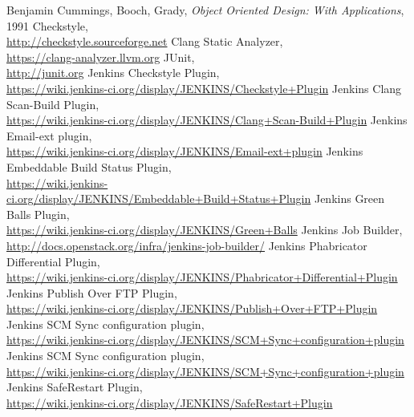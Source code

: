 \documentclass[a4paper,twocolumn,10pt]{article}
\begin{document}
\begin{thebibliography}{999}
 Benjamin Cummings, Booch, Grady, \textit{Object Oriented Design: With Applications},\\
1991
 Checkstyle,\\
\url{http://checkstyle.sourceforge.net}
 Clang Static Analyzer,\\
\url{https://clang-analyzer.llvm.org}
 JUnit,\\
\url{http://junit.org}
 Jenkins Checkstyle Plugin,\\
\url{https://wiki.jenkins-ci.org/display/JENKINS/Checkstyle+Plugin}
 Jenkins Clang Scan-Build Plugin,\\
\url{https://wiki.jenkins-ci.org/display/JENKINS/Clang+Scan-Build+Plugin}
 Jenkins Email-ext plugin,\\
\url{https://wiki.jenkins-ci.org/display/JENKINS/Email-ext+plugin}
 Jenkins Embeddable Build Status Plugin,\\
\url{https://wiki.jenkins-ci.org/display/JENKINS/Embeddable+Build+Status+Plugin}
 Jenkins Green Balls Plugin,\\
\url{https://wiki.jenkins-ci.org/display/JENKINS/Green+Balls}
 Jenkins Job Builder,\\
\url{http://docs.openstack.org/infra/jenkins-job-builder/}
 Jenkins Phabricator Differential Plugin,\\
\url{https://wiki.jenkins-ci.org/display/JENKINS/Phabricator+Differential+Plugin}
 Jenkins Publish Over FTP Plugin,\\
\url{https://wiki.jenkins-ci.org/display/JENKINS/Publish+Over+FTP+Plugin}
 Jenkins SCM Sync configuration plugin,\\
\url{https://wiki.jenkins-ci.org/display/JENKINS/SCM+Sync+configuration+plugin}
 Jenkins SCM Sync configuration plugin,\\
\url{https://wiki.jenkins-ci.org/display/JENKINS/SCM+Sync+configuration+plugin}
 Jenkins SafeRestart Plugin,\\
\url{https://wiki.jenkins-ci.org/display/JENKINS/SafeRestart+Plugin}

\end{thebibliography}
\end{document}
